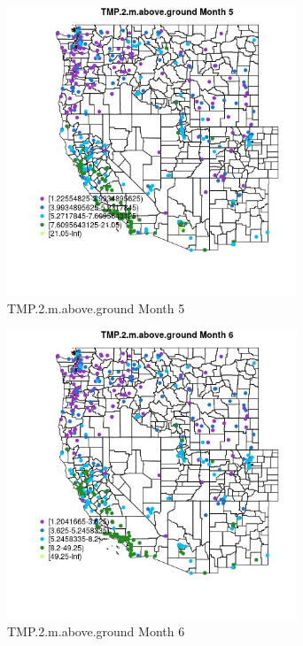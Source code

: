 \begin{figure} 
\centering  
\includegraphics[width=0.77\textwidth]{Code_Outputs/ML_input_report_ML_input_PM25_Step5_part_d_de_duplicated_aves_ML_input_MapObsMo5TMP2maboveground.jpg} 
\caption{\label{fig:ML_input_report_ML_input_PM25_Step5_part_d_de_duplicated_aves_ML_inputMapObsMo5TMP2maboveground}TMP.2.m.above.ground Month 5} 
\end{figure} 
 

\begin{figure} 
\centering  
\includegraphics[width=0.77\textwidth]{Code_Outputs/ML_input_report_ML_input_PM25_Step5_part_d_de_duplicated_aves_ML_input_MapObsMo6TMP2maboveground.jpg} 
\caption{\label{fig:ML_input_report_ML_input_PM25_Step5_part_d_de_duplicated_aves_ML_inputMapObsMo6TMP2maboveground}TMP.2.m.above.ground Month 6} 
\end{figure} 
 

